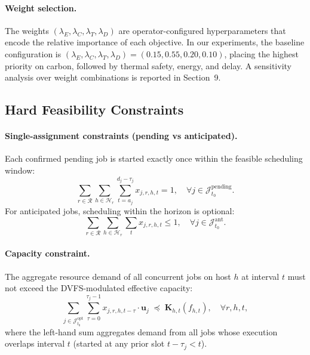 \documentclass[a4paper,fleqn]{cas-dc}
\begin{document}
\paragraph{Weight selection.}
The weights $(\lambda_E, \lambda_C, \lambda_T, \lambda_D)$ are operator-configured hyperparameters that encode the relative importance of each objective. In our experiments, the baseline configuration is $(\lambda_E, \lambda_C, \lambda_T, \lambda_D) = (0.15, 0.55, 0.20, 0.10)$, placing the highest priority on carbon, followed by thermal safety, energy, and delay. A sensitivity analysis over weight combinations is reported in Section~9.

\subsection{Hard Feasibility Constraints}
\label{sec:hard_constraints}

\paragraph{Single-assignment constraints (pending vs anticipated).}
Each confirmed pending job is started exactly once within the feasible scheduling window:
\begin{equation}
\label{eq:assign_once}
\sum_{r \in \mathcal{R}} \sum_{h \in \mathcal{H}_r} \sum_{t=a_j}^{d_j - \tau_j} x_{j,r,h,t} = 1, \quad \forall j \in \mathcal{J}^{\mathrm{pending}}_{t_0}.
\end{equation}
For anticipated jobs, scheduling within the horizon is optional:
\begin{equation}
\label{eq:assign_ant}
\sum_{r \in \mathcal{R}} \sum_{h \in \mathcal{H}_r} \sum_{t} x_{j,r,h,t} \leq 1, \quad \forall j \in \mathcal{J}^{\mathrm{ant}}_{t_0}.
\end{equation}

\paragraph{Capacity constraint.}
The aggregate resource demand of all concurrent jobs on host $h$ at interval $t$ must not exceed the DVFS-modulated effective capacity:
\begin{equation}
\label{eq:capacity}
\sum_{j \in \mathcal{J}^{\mathrm{opt}}_{t_0}} \sum_{\tau=0}^{\tau_j-1} x_{j,r,h,t-\tau} \cdot \mathbf{u}_j \;\preceq\; \mathbf{K}_{h,t}(f_{h,t}), \quad \forall r,h,t,
\end{equation}
where the left-hand sum aggregates demand from all jobs whose execution overlaps interval $t$ (started at any prior slot $t-\tau_j < t$).
\end{document}
